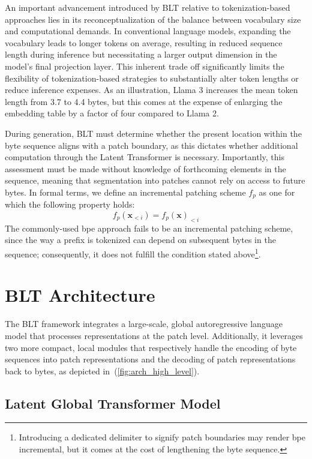 An important advancement introduced by {\textsc BLT} relative to tokenization-based approaches lies in its reconceptualization of the balance between vocabulary size and computational demands. In conventional language models, expanding the vocabulary leads to longer tokens on average, resulting in reduced sequence length during inference but necessitating a larger output dimension in the model’s final projection layer. This inherent trade off significantly limits the flexibility of tokenization-based strategies to substantially alter token lengths or reduce inference expenses. As an illustration, Llama 3 increases the mean token length from 3.7 to 4.4 bytes, but this comes at the expense of enlarging the embedding table by a factor of four compared to Llama 2.

During generation, {\textsc BLT} must determine whether the present location within the byte sequence aligns with a patch boundary, as this dictates whether additional computation through the Latent Transformer is necessary. Importantly, this assessment must be made without knowledge of forthcoming elements in the sequence, meaning that segmentation into patches cannot rely on access to future bytes. In formal terms, we define an incremental patching scheme $f_p$ as one for which the following property holds:
$$f_p(\pmb{x}_{<i}) = f_p(\pmb{x})_{<i}$$
The commonly-used bpe approach fails to be an incremental patching scheme, since the way a prefix is tokenized can depend on subsequent bytes in the sequence; consequently, it does not fulfill the condition stated above\footnote{Introducing a dedicated delimiter to signify patch boundaries may render bpe incremental, but it comes at the cost of lengthening the byte sequence.}.

\section{{\textsc BLT} Architecture}
\label{section:architecture}
The {\textsc BLT} framework integrates a large-scale, global autoregressive language model that processes representations at the patch level. Additionally, it leverages two more compact, local modules that respectively handle the encoding of byte sequences into patch representations and the decoding of patch representations back to bytes, as depicted in~(\autoref{fig:arch_high_level}).

\subsection{Latent Global Transformer Model}

